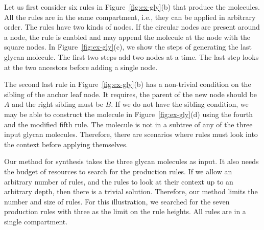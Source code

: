 Let us first consider six rules in Figure~\ref{fig:ex-gly}(b)
that produce the molecules.
All the rules are in the same compartment, i.e., they can be applied in arbitrary order.
The rules have two kinds of nodes.
If the circular nodes are present around a node,
the rule is enabled and may append the molecule at the
node with the square nodes.
In Figure~\ref{fig:ex-gly}(c), we show the steps of generating the last
glycan molecule.
The first two steps add two nodes at a time.
The last step looks at the two ancestors before adding a single node.

The second last rule in Figure~\ref{fig:ex-gly}(b) has a non-trivial condition
on the sibling of the anchor leaf node.
It requires, the parent of the new node should be $A$ and the right sibling
must be $B$.
If we do not have the sibling condition, we may be able to construct the molecule
in Figure~\ref{fig:ex-gly}(d) using the fourth and the modified fifth rule.
The molecule is not in a subtree of any of the three input glycan molecules.
Therefore, there are scenarios where rules must look into the context before applying
themselves.



Our method for synthesis takes the three glycan molecules as input.
It also needs the budget of resources to search for the production rules.
If we allow an arbitrary number of rules,
and the rules to look at their context up to
an arbitrary depth, %
then there is a trivial solution.
Therefore, our method limits the number and size of rules.
For this illustration, we searched for the seven production rules with
three as the limit on the rule heights.
All rules are in a single compartment.

